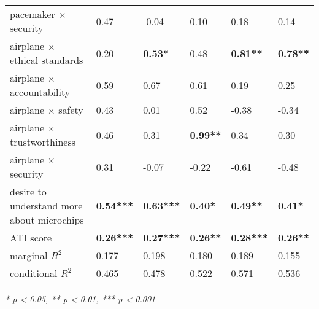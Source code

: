 \begin{table*}[htbp]
\begin{tabularx}{\linewidth}{XL{1.5cm}L{1.5cm}L{1.5cm}L{1.5cm}L{1.5cm}}
        pacemaker $\times$ security & 0.47 &  -0.04 & 0.10 & 0.18  & 0.14 \\
        airplane $\times$ ethical standards & 0.20 & \textbf{0.53*} & 0.48 & \textbf{0.81**} & \textbf{0.78**} \\
        airplane $\times$ accountability & 0.59  & 0.67 & 0.61 & 0.19 & 0.25 \\
        airplane $\times$ safety & 0.43 & 0.01 & 0.52 & -0.38  & -0.34 \\
        airplane $\times$ trustworthiness & 0.46 & 0.31 & \textbf{0.99**} & 0.34 & 0.30 \\
        airplane $\times$ security & 0.31 &  -0.07 & -0.22 & -0.61  & -0.48 \\
        \midrule
        desire to understand more about microchips & \textbf{0.54***} & \textbf{0.63***} & \textbf{0.40*} & \textbf{0.49**} & \textbf{0.41*}\\
        ATI score & \textbf{0.26***} & \textbf{0.27***} & \textbf{0.26**} & \textbf{0.28***} & \textbf{0.26**}\\
        \midrule
        marginal $R^2$    & 0.177 & 0.198 & 0.180 & 0.189 & 0.155\\
        conditional $R^2$ & 0.465 & 0.478 & 0.522 & 0.571 & 0.536\\    
        \bottomrule
     \end{tabularx}
     \textit{* p < 0.05, ** p < 0.01, *** p < 0.001}
\end{table*}
